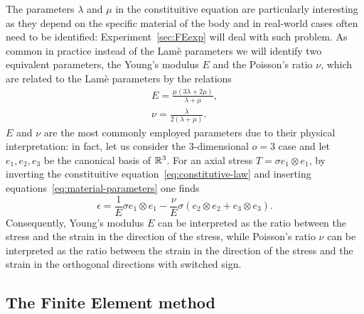 The parameters $\lambda$ and $\mu$ in the constituitive equation are particularly interesting as they depend on the specific material of the body and in real-world cases often need to be identified: Experiment~\ref{sec:FEexp} will deal with such problem.
As common in practice instead of the Lamè parameters we will identify two equivalent parameters, the Young's modulus $E$ and the Poisson's ratio $\nu$, which are related to the Lamè parameters by the relations
\begin{equation}\label{eq:material-parameters}
    \begin{gathered}
        E = \frac{\mu(3\lambda + 2\mu)}{\lambda + \mu}, \\
        \nu = \frac{\lambda}{2(\lambda + \mu)}.
    \end{gathered}
\end{equation}
$E$ and $\nu$ are the most commonly employed parameters due to their physical interpretation: in fact, let us consider the 3-dimensional $o=3$ case and let $e_1,e_2,e_3$ be the canonical basis of $\mathbb{R}^3$.
For an axial stress $T = \sigma e_1 \otimes e_1$, by inverting the constituitive equation~\eqref{eq:constitutive-law} and inserting equations~\eqref{eq:material-parameters} one finds 
\[
    \epsilon = \frac{1}{E} \sigma e_1 \otimes e_1 - \frac{\nu}{E} \sigma ( e_2 \otimes e_2 + e_3 \otimes e_3).
\]  
Consequently, Young's modulus $E$ can be interpreted as the ratio between the stress and the strain in the direction of the stress, while Poisson's ratio $\nu$ can be interpreted as the ratio between the strain in the direction of the stress and the strain in the orthogonal directions with switched sign.

\subsection{The Finite Element method} \label{sec:AdaFE}

